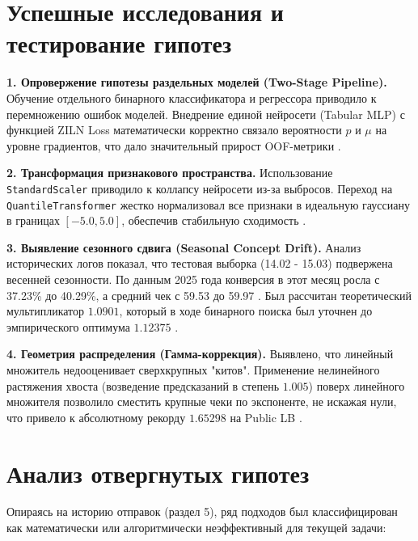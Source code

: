 \documentclass[12pt, a4paper]{article}
\begin{document}
	\section{Успешные исследования и тестирование гипотез}
	
	\textbf{1. Опровержение гипотезы раздельных моделей (Two-Stage Pipeline).} 
	Обучение отдельного бинарного классификатора и регрессора приводило к перемножению ошибок моделей. Внедрение единой нейросети (Tabular MLP) с функцией ZILN Loss математически корректно связало вероятности $p$ и $\mu$ на уровне градиентов, что дало значительный прирост OOF-метрики \cite{ref:train}.
	
	\textbf{2. Трансформация признакового пространства.}
	Использование \texttt{StandardScaler} приводило к коллапсу нейросети из-за выбросов. Переход на \texttt{QuantileTransformer} жестко нормализовал все признаки в идеальную гауссиану в границах $[-5.0, 5.0]$, обеспечив стабильную сходимость \cite{ref:train}.
	
	\textbf{3. Выявление сезонного сдвига (Seasonal Concept Drift).}
	Анализ исторических логов показал, что тестовая выборка (14.02 - 15.03) подвержена весенней сезонности. По данным 2025 года конверсия в этот месяц росла с 37.23\% до 40.29\%, а средний чек с 59.53 до 59.97 \cite{ref:tests}.
	Был рассчитан теоретический мультипликатор $1.0901$, который в ходе бинарного поиска был уточнен до эмпирического оптимума $1.12375$ \cite{ref:tests}.
	
	\textbf{4. Геометрия распределения (Гамма-коррекция).}
	Выявлено, что линейный множитель недооценивает сверхкрупных "китов". Применение нелинейного растяжения хвоста (возведение предсказаний в степень $1.005$) поверх линейного множителя позволило сместить крупные чеки по экспоненте, не искажая нули, что привело к абсолютному рекорду $1.65298$ на Public LB \cite{ref:tests}.
	
	\section{Анализ отвергнутых гипотез}
	
	Опираясь на историю отправок (раздел 5), ряд подходов был классифицирован как математически или алгоритмически неэффективный для текущей задачи:
	
\end{document}
